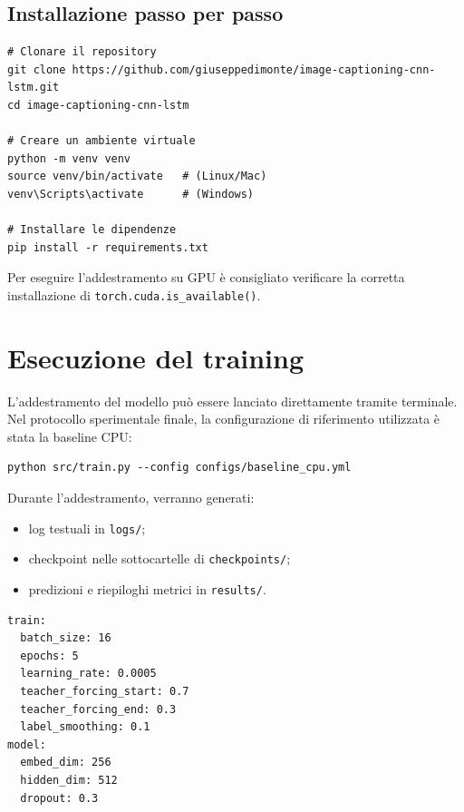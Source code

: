 \documentclass[11pt,a4paper]{report}
\begin{document}
\subsection{Installazione passo per passo}

\begin{verbatim}
# Clonare il repository
git clone https://github.com/giuseppedimonte/image-captioning-cnn-lstm.git
cd image-captioning-cnn-lstm

# Creare un ambiente virtuale
python -m venv venv
source venv/bin/activate   # (Linux/Mac)
venv\Scripts\activate      # (Windows)

# Installare le dipendenze
pip install -r requirements.txt
\end{verbatim}

\begin{tcolorbox}[title=Suggerimento]
Per eseguire l'addestramento su GPU è consigliato verificare la corretta installazione di \texttt{torch.cuda.is\_available()}.
\end{tcolorbox}

\section{Esecuzione del training}

L’addestramento del modello può essere lanciato direttamente tramite terminale. Nel protocollo sperimentale finale, la configurazione di riferimento utilizzata è stata la baseline CPU:

\begin{verbatim}
python src/train.py --config configs/baseline_cpu.yml
\end{verbatim}

Durante l’addestramento, verranno generati:
\begin{itemize}
  \item log testuali in \texttt{logs/};
  \item checkpoint nelle sottocartelle di \texttt{checkpoints/};
  \item predizioni e riepiloghi metrici in \texttt{results/}.
\end{itemize}

\begin{tcolorbox}[title=Esempio di configurazione YAML]
\begin{verbatim}
train:
  batch_size: 16
  epochs: 5
  learning_rate: 0.0005
  teacher_forcing_start: 0.7
  teacher_forcing_end: 0.3
  label_smoothing: 0.1
model:
  embed_dim: 256
  hidden_dim: 512
  dropout: 0.3
\end{verbatim}
\end{tcolorbox}
\end{document}
